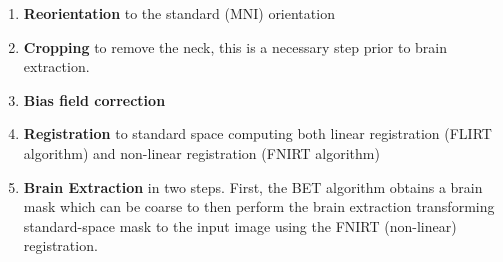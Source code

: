 \documentclass[11pt]{article}
\theoremstyle{definition}
\theoremstyle{remark}
\begin{document}
\begin{enumerate}  
  \item \textbf{Reorientation} to the standard (MNI) orientation
  \item \textbf{Cropping} to remove the neck, this is a necessary step prior to brain extraction. 
  \item \textbf{Bias field correction} 
  \item \textbf{Registration} to standard space computing both linear registration (FLIRT algorithm) and non-linear registration (FNIRT algorithm)
  \item \textbf{Brain Extraction} in two steps. First, the BET algorithm obtains a brain mask which can be coarse to then perform the brain extraction transforming standard-space mask to the input image using the FNIRT (non-linear) registration.

\end{enumerate}
\end{document}
